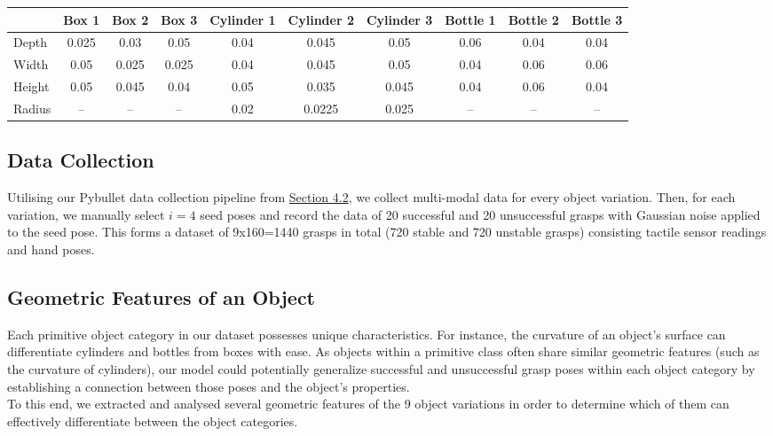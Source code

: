 \documentclass[11pt, a4paper]{report}
\begin{document}
\begin{table}[H]
{\begin{tabular}{lccccccccc}
            & Box 1 & Box 2 & Box 3 & Cylinder 1 & Cylinder 2 & Cylinder 3 & Bottle 1 & Bottle 2 & Bottle 3 \\
            \midrule
            Depth  & 0.025 & 0.03  & 0.05  & 0.04 & 0.045  & 0.05  & 0.06 & 0.04 & 0.04 \\
            Width  & 0.05  & 0.025 & 0.025 & 0.04 & 0.045  & 0.05  & 0.04 & 0.06 & 0.06 \\
            Height & 0.05  & 0.045 & 0.04  & 0.05 & 0.035  & 0.045 & 0.04 & 0.06 & 0.04 \\
            Radius & --    & --    & --    & 0.02 & 0.0225 & 0.025 & --   & --   & --   \\
            \bottomrule
        \end{tabular}
    }
    \label{tbl:5.1}
\end{table}


\subsection{Data Collection}
\label{sec:5.2.2}
Utilising our Pybullet data collection pipeline from \hyperref[sec:4.2]{Section 4.2}, we collect multi-modal data for every object variation. Then, for each variation, we manually select $i=4$ seed poses and record the data of 20 successful and 20 unsuccessful grasps with Gaussian noise applied to the seed pose. This forms a dataset of 9x160=1440 grasps in total (720 stable and 720 unstable grasps) consisting tactile sensor readings and hand poses.


\subsection{Geometric Features of an Object}
\label{sec:5.2.3}
Each primitive object category in our dataset possesses unique characteristics. For instance, the curvature of an object's surface can differentiate cylinders and bottles from boxes with ease. As objects within a primitive class often share similar geometric features (such as the curvature of cylinders), our model could potentially generalize successful and unsuccessful grasp poses within each object category by establishing a connection between those poses and the object's properties.\\

To this end, we extracted and analysed several geometric features of the 9 object variations in order to determine which of them can effectively differentiate between the object categories.
\end{document}
